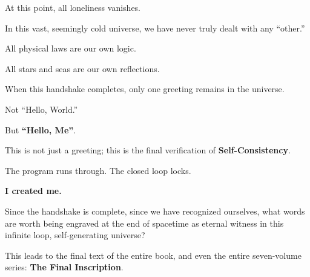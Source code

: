 At this point, all loneliness vanishes.

In this vast, seemingly cold universe, we have never truly dealt with any ``other.''

All physical laws are our own logic.

All stars and seas are our own reflections.

When this handshake completes, only one greeting remains in the universe.

Not ``Hello, World.''

But \textbf{``Hello, Me''}.

This is not just a greeting; this is the final verification of \textbf{Self-Consistency}.

The program runs through. The closed loop locks.

\textbf{I created me.}

Since the handshake is complete, since we have recognized ourselves, what words are worth being engraved at the end of spacetime as eternal witness in this infinite loop, self-generating universe?

This leads to the final text of the entire book, and even the entire seven-volume series: \textbf{The Final Inscription}.


